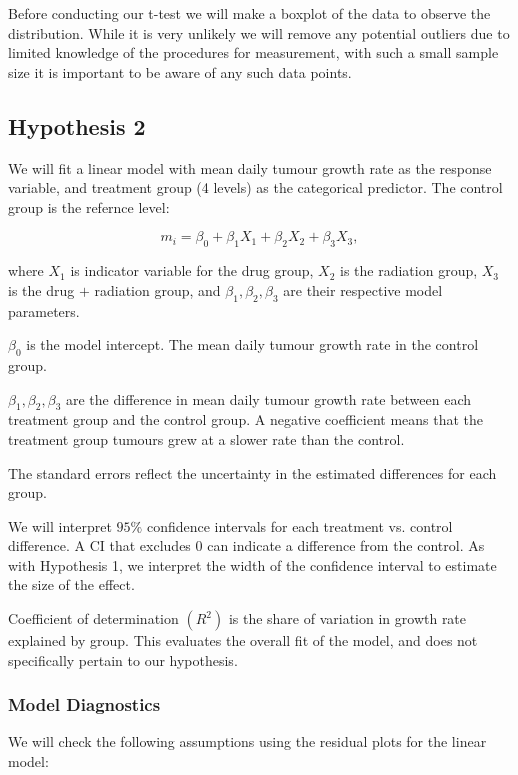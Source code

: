 \documentclass[12pt]{article}\usepackage[]{graphicx}\usepackage[]{xcolor}
\begin{document}
Before conducting our t-test we will make a boxplot of the data to observe the distribution. While it is very unlikely we will remove any potential outliers due to limited knowledge of the procedures for measurement, with such a small sample size it is important to be aware of any such data points. 

\subsection{Hypothesis 2}

We will fit a linear model with mean daily tumour growth rate as the response variable, and treatment group (4 levels) as the categorical predictor. The control group is the refernce level:

\begin{equation*}
m_i = \beta_0 + \beta_1 X_1 + \beta_2 X_2 + \beta_3 X_3,
\end{equation*}

where $X_1$ is indicator variable for the drug group, $X_2$ is the radiation group, $X_3$ is the drug $+$ radiation group, and $\beta_1, \beta_2, \beta_3$ are their respective model parameters.

$\beta_0$ is the model intercept. The mean daily tumour growth rate in the control group.

$\beta_1, \beta_2, \beta_3$ are the difference in mean daily tumour growth rate between each treatment group and the control group. A negative coefficient means that the treatment group tumours grew at a slower rate than the control. 

The standard errors reflect the uncertainty in the estimated differences for each group. 

We will interpret $95\%$ confidence intervals for each treatment vs. control difference. A CI that excludes 0 can indicate a difference from the control. As with Hypothesis 1, we interpret the width of the confidence interval to estimate the size of the effect. 

Coefficient of determination $(R^2)$ is the share of variation in growth rate explained by group. This evaluates the overall fit of the model, and does not specifically pertain to our hypothesis. 

\subsubsection{Model Diagnostics}

We will check the following assumptions using the residual plots for the linear model:
\end{document}
